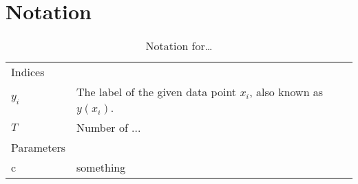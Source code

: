 \chapter*{Notation}
\label{ch:notation}

\begin{table}
    \caption{Notation for\ldots}
    \begin{tabularx}{\textwidth}{@{}XX@{}}
        \toprule
        Indices \\
        $y_i$ & The label of the given data point $x_i$, also known as $y(x_i)$. \\
        $T$ & Number of ... \\
        Parameters \\
        c   & something \\
        \bottomrule
    \end{tabularx}
\end{table}